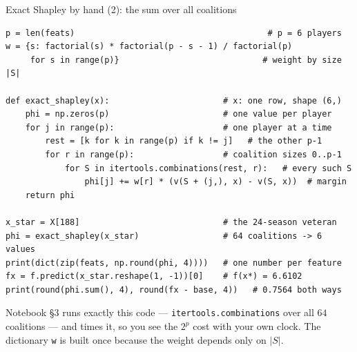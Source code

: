 \documentclass[aspectratio=169,11pt]{beamer}
\begin{document}
\begin{frame}[fragile]{Exact Shapley by hand (2): the sum over all coalitions}
  \begin{lstlisting}[basicstyle=\ttfamily\fontsize{7}{8}\selectfont,aboveskip=2pt,belowskip=2pt]
p = len(feats)                                       # p = 6 players
w = {s: factorial(s) * factorial(p - s - 1) / factorial(p)
     for s in range(p)}                             # weight by size |S|

def exact_shapley(x):                       # x: one row, shape (6,)
    phi = np.zeros(p)                       # one value per player
    for j in range(p):                      # one player at a time
        rest = [k for k in range(p) if k != j]   # the other p-1
        for r in range(p):                  # coalition sizes 0..p-1
            for S in itertools.combinations(rest, r):   # every such S
                phi[j] += w[r] * (v(S + (j,), x) - v(S, x))  # margin
    return phi

x_star = X[188]                             # the 24-season veteran
phi = exact_shapley(x_star)                 # 64 coalitions -> 6 values
print(dict(zip(feats, np.round(phi, 4))))   # one number per feature
fx = f.predict(x_star.reshape(1, -1))[0]    # f(x*) = 6.6102
print(round(phi.sum(), 4), round(fx - base, 4))   # 0.7564 both ways
  \end{lstlisting}
  \begin{labnote}
    \scriptsize
    Notebook \S3 runs exactly this code --- \texttt{itertools.combinations} over all
    $64$ coalitions --- and times it, so you see the $2^p$ cost with your own clock.
    The dictionary \texttt{w} is built once because the weight depends only on $|S|$.
  \end{labnote}
\end{frame}
\end{document}
